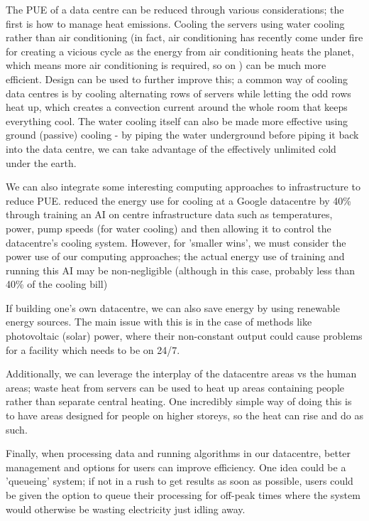 \documentclass{article}
\begin{document}
The PUE of a data centre can be reduced through various considerations; the first is how to manage heat emissions. Cooling the servers using water cooling rather than air conditioning (in fact, air conditioning has recently come under fire for creating a vicious cycle as the energy from air conditioning heats the planet, which means more air conditioning is required, so on \citep{ospina2018cooling}) can be much more efficient. Design can be used to further improve this; a common way of cooling data centres is by cooling alternating rows of servers while letting the odd rows heat up, which creates a convection current around the whole room that keeps everything cool. The water cooling itself can also be made more effective using ground (passive) cooling - by piping the water underground before piping it back into the data centre, we can take advantage of the effectively unlimited cold under the earth. \newline

We can also integrate some interesting computing approaches to infrastructure to reduce PUE. \citet{evans2016deepmind} reduced the energy use for cooling at a Google datacentre by 40\% through training an AI on centre infrastructure data such as temperatures, power, pump speeds (for water cooling) and then allowing it to control the datacentre's cooling system. However, for 'smaller wins', we must consider the power use of our computing approaches; the actual energy use of training and running this AI may be non-negligible (although in this case, probably less than 40\% of the cooling bill) \newline

If building one's own datacentre, we can also save energy by using renewable energy sources. The main issue with this is in the case of methods like photovoltaic (solar) power, where their non-constant output could cause problems for a facility which needs to be on 24/7.\newline

Additionally, we can leverage the interplay of the datacentre areas vs the human areas; waste heat from servers can be used to heat up areas containing people rather than separate central heating. One incredibly simple way of doing this is to have areas designed for people on higher storeys, so the heat can rise and do as such. \newline

Finally, when processing data and running algorithms in our datacentre, better management and options for users can improve efficiency. One idea could be a 'queueing' system; if not in a rush to get results as soon as possible, users could be given the option to queue their processing for off-peak times where the system would otherwise be wasting electricity just idling away.
\end{document}

